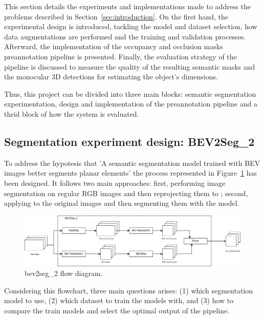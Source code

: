 
This section details the experiments and implementations made to address the problems described in Section~\ref{sec:introduction}. On the first hand, the experimental design is introduced, tackling the model and dataset selection, how data augmentations are performed and the training and validation processes. Afterward, the implementation of the occupancy and occlusion masks preannotation pipeline is presented. Finally, the evaluation strategy of the pipeline is discussed to measure the quality of the resulting semantic masks and the monocular 3D detections for estimating the object's dimensions.

Thus, this project can be divided into three main blocks:  semantic segmentation experimentation, design and implementation of the preannotation pipeline and a thrid block of how the system is evaluated.

\subsection{Segmentation experiment design: BEV2Seg\_2}
\label{sec:bev2seg_2}

To address the hypotesis that 'A semantic segmentation model trained with BEV images better segments planar elements' the process represented in Figure~\ref{fig:beg2seg_2_flow} has been designed. It follows two main approaches: first, performing image segmentation on regular RGB images and then reprojecting them to ; second, applying  to the original images and then segmenting them with the model.

\begin{figure}[h!]
    \centering
    \includegraphics[width=\linewidth]{./images/methodology/bev2seg_2_flow.png}
    \caption{bev2seg\_2 flow diagram.}
    \label{fig:beg2seg_2_flow}
\end{figure}

Considering this flowchart, three main questions arises: (1) which segmentation model to use, (2) which dataset to train the models with, and (3) how to compare the train models and select the optimal output of the pipeline. 

